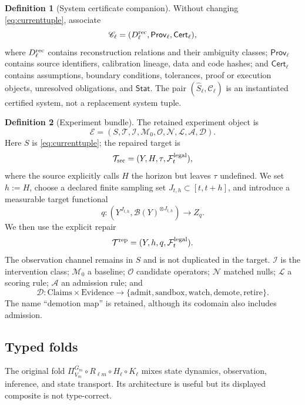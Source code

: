 \documentclass[11pt,a4paper]{article}
\theoremstyle{definition}
\newtheorem{definition}{Definition}[section]
\theoremstyle{plain}
\theoremstyle{remark}
\newcommand{\Cert}{\mathsf{Cert}}
\newcommand{\Stat}{\mathsf{Stat}}
\newcommand{\Prov}{\mathsf{Prov}}
\begin{document}
\begin{definition}[System certificate companion]\label{def:systemcert}
Without changing \eqref{eq:currenttuple}, associate
\[
\mathscr C_\ell=(D_\ell^{\rm rec},\Prov_\ell,\Cert_\ell),
\]
where \(D_\ell^{\rm rec}\) contains reconstruction relations and their
ambiguity classes; \(\Prov_\ell\) contains source identifiers, calibration
lineage, data and code hashes; and \(\Cert_\ell\) contains assumptions,
boundary conditions, tolerances, proof or execution objects, unresolved
obligations, and \(\Stat\).  The pair
\((\widehat S_\ell,\mathscr C_\ell)\) is an instantiated certified system, not
a replacement system tuple.
\end{definition}

\begin{definition}[Experiment bundle]\label{def:experimentbundle}
The retained experiment object is
\[
\mathcal E=(S,\mathcal T,\mathcal I,\mathcal M_0,\mathcal O,
\mathcal N,\mathcal L,\mathcal A,\mathcal D).
\]
Here \(S\) is \eqref{eq:currenttuple}; the repaired target is
\[
\mathcal T_{\rm src}=(Y,H,\tau,\mathcal F_t^{\rm legal}),
\]
where the source explicitly calls \(H\) the horizon but leaves \(\tau\)
undefined.  We set \(h:=H\), choose a declared finite sampling set
\(J_{t,h}\subset[t,t+h]\), and introduce a measurable target functional
\[
q:(Y^{J_{t,h}},\mathcal B(Y)^{\otimes J_{t,h}})\to Z_q .
\]
We then use the explicit repair
\[
\mathcal T^{\rm rep}=(Y,h,q,\mathcal F_t^{\rm legal}).
\]
The observation channel remains in \(S\) and is not duplicated in the target.
\(\mathcal I\) is the intervention class; \(\mathcal M_0\) a baseline;
\(\mathcal O\) candidate operators; \(\mathcal N\) matched nulls;
\(\mathcal L\) a scoring rule; \(\mathcal A\) an admission rule; and
\[
\mathcal D:\mathrm{Claims}\times\mathrm{Evidence}\to
\{\mathrm{admit},\mathrm{sandbox},\mathrm{watch},\mathrm{demote},
\mathrm{retire}\}.
\]
The name ``demotion map'' is retained, although its codomain also includes
admission.
\end{definition}

\subsection{Typed folds}

The original fold
\(\Pi_{V_m}^{G_m}\circ R_{\ell m}\circ H_\ell\circ K_\ell\)
mixes state dynamics, observation, inference, and state transport.  Its
architecture is useful but its displayed composite is not type-correct.
\end{document}
